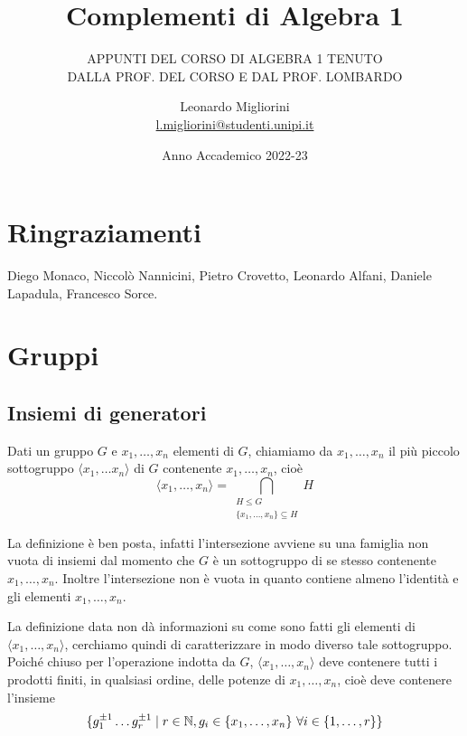 \documentclass[11pt]{scrartcl}
\begin{document}
\title{Complementi di Algebra 1}
\subtitle{\large\normalfont\rmfamily\scshape APPUNTI DEL CORSO DI ALGEBRA 1 TENUTO\\ DALLA PROF. DEL CORSO E DAL PROF. LOMBARDO}
\author{Leonardo Migliorini \\ \textnormal{\href{l.migliorini@studenti.unipi.it}{l.migliorini@studenti.unipi.it}}}
\date{Anno Accademico 2022-23}
\maketitle
\newpage

\tableofcontents
\eject
\newpage

\section*{Ringraziamenti}

Diego Monaco, Niccolò Nannicini, Pietro Crovetto, Leonardo Alfani, Daniele
Lapadula, Francesco Sorce.

\newpage

\section{Gruppi}

\subsection{Insiemi di generatori}

\begin{definition}
    Dati un gruppo $G$ e $x_1, \ldots, x_n$ elementi di $G$, chiamiamo  da $x_1, \ldots, x_n$ il più piccolo sottogruppo $\langle x_1, \ldots x_n
    \rangle$ di $G$ contenente $x_1, \ldots, x_n$, cioè \[\langle x_1, \ldots, x_n\rangle =
    \bigcap_{\substack{H\leqslant G\\ \{x_1, \ldots, x_n\} \subseteq H}} H\] 
\end{definition}

\begin{remark}
    La definizione è ben posta, infatti l'intersezione avviene su una 
    famiglia non vuota di insiemi dal momento che $G$ è un sottogruppo di 
    se stesso contenente $x_1, \ldots, x_n$. Inoltre l'intersezione non è vuota in 
    quanto contiene almeno l'identità e gli elementi $x_1, \ldots, x_n$.
\end{remark}

La definizione data non dà informazioni su come sono fatti gli elementi di 
$\langle x_1, \ldots, x_n\rangle$, cerchiamo quindi di caratterizzare in modo
diverso tale sottogruppo. Poiché chiuso per l'operazione indotta da $G$, $\langle x_1, \ldots, x_n\rangle$
deve contenere tutti i prodotti finiti, in qualsiasi ordine, delle potenze di
$x_1, \ldots, x_n$, cioè deve contenere l'insieme 
\[\{g_1^{\pm 1} \ldots g_r^{\pm 1}\mid r \in \mathbb N, g_i \in \{x_1, \ldots, x_n\}
~\forall i \in \{1, \ldots, r\}\}\]
\end{document}

